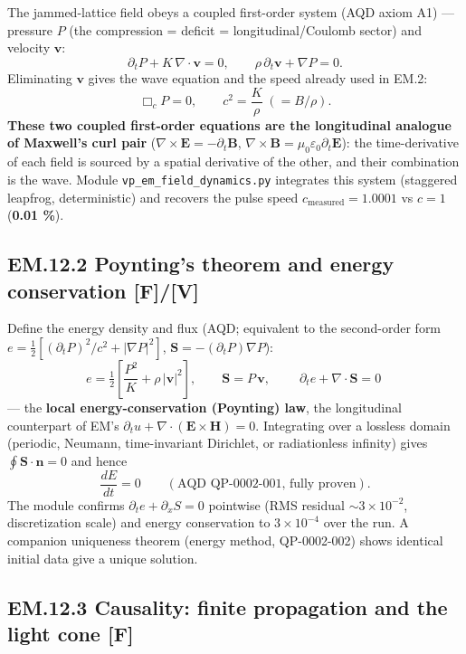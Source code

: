 \documentclass[
  10pt,
]{article}
\begin{document}
The jammed-lattice field obeys a coupled first-order system (AQD axiom
A1) --- pressure \(P\) (the compression = deficit = longitudinal/Coulomb
sector) and velocity \(\mathbf v\): \[
\partial_t P + K\,\nabla\!\cdot\mathbf v = 0,
\qquad
\rho\,\partial_t \mathbf v + \nabla P = 0.
\] Eliminating \(\mathbf v\) gives the wave equation and the speed
already used in EM.2: \[
\Box_c P = 0,\qquad c^2 = \frac{K}{\rho}\;(=B/\rho).
\] \textbf{These two coupled first-order equations are the longitudinal
analogue of Maxwell's curl pair}
(\(\nabla\times\mathbf E=-\partial_t\mathbf B\),
\(\nabla\times\mathbf B=\mu_0\varepsilon_0\partial_t\mathbf E\)): the
time-derivative of each field is sourced by a spatial derivative of the
other, and their combination is the wave. Module
\texttt{vp\_em\_field\_dynamics.py} integrates this system (staggered
leapfrog, deterministic) and recovers the pulse speed
\(c_{\text{measured}}=1.0001\) vs \(c=1\) (\textbf{0.01 \%}).

\hypertarget{em.12.2-poyntings-theorem-and-energy-conservation-fv}{%
\subsection{\texorpdfstring{EM.12.2 Poynting's theorem and energy
conservation
\textbf{{[}F{]}/{[}V{]}}}{EM.12.2 Poynting's theorem and energy conservation {[}F{]}/{[}V{]}}}\label{em.12.2-poyntings-theorem-and-energy-conservation-fv}}

Define the energy density and flux (AQD; equivalent to the second-order
form \(e=\tfrac12[(\partial_tP)^2/c^2+|\nabla P|^2]\),
\(\mathbf S=-(\partial_tP)\nabla P\)): \[
e = \tfrac12\!\left[\frac{P^2}{K} + \rho\,|\mathbf v|^2\right],
\qquad
\mathbf S = P\,\mathbf v,
\qquad
\boxed{\;\partial_t e + \nabla\!\cdot\mathbf S = 0\;}
\] --- the \textbf{local energy-conservation (Poynting) law}, the
longitudinal counterpart of EM's
\(\partial_t u + \nabla\!\cdot(\mathbf E\times\mathbf H)=0\).
Integrating over a lossless domain (periodic, Neumann, time-invariant
Dirichlet, or radiationless infinity) gives
\(\oint\mathbf S\!\cdot\!\mathbf n=0\) and hence \[
\frac{dE}{dt}=0\qquad(\text{AQD QP-0002-001, fully proven}).
\] The module confirms \(\partial_t e+\partial_x S=0\) pointwise (RMS
residual \(\sim 3\times10^{-2}\), discretization scale) and energy
conservation to \(3\times10^{-4}\) over the run. A companion uniqueness
theorem (energy method, QP-0002-002) shows identical initial data give a
unique solution.

\hypertarget{em.12.3-causality-finite-propagation-and-the-light-cone-f}{%
\subsection{\texorpdfstring{EM.12.3 Causality: finite propagation and
the light cone
\textbf{{[}F{]}}}{EM.12.3 Causality: finite propagation and the light cone {[}F{]}}}\label{em.12.3-causality-finite-propagation-and-the-light-cone-f}}
\end{document}
